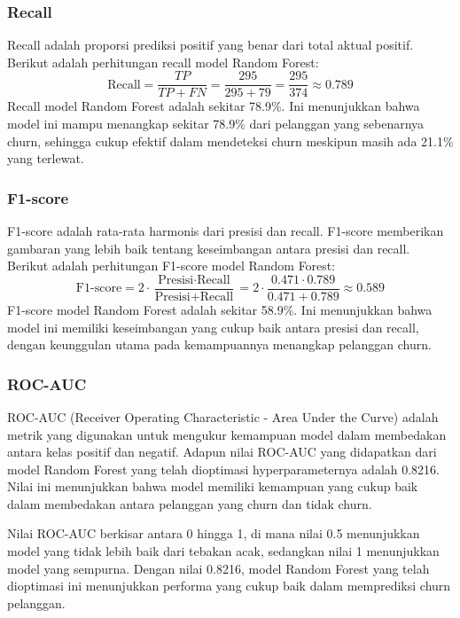 \subsubsection*{Recall}
Recall adalah proporsi prediksi positif yang benar dari total aktual positif. Berikut adalah perhitungan recall model Random Forest:
\begin{equation}
    \text{Recall} = \frac{TP}{TP + FN} = \frac{295}{295 + 79} = \frac{295}{374} \approx 0.789
\end{equation}
Recall model Random Forest adalah sekitar 78.9\%. Ini menunjukkan bahwa model ini mampu menangkap sekitar 78.9\% dari pelanggan yang sebenarnya churn, sehingga cukup efektif dalam mendeteksi churn meskipun masih ada 21.1\% yang terlewat.

\subsubsection*{F1-score}
F1-score adalah rata-rata harmonis dari presisi dan recall. F1-score memberikan gambaran yang lebih baik tentang keseimbangan antara presisi dan recall. Berikut adalah perhitungan F1-score model Random Forest:
\begin{equation}
    \text{F1-score} = 2 \cdot \frac{\text{Presisi} \cdot \text{Recall}}{\text{Presisi} + \text{Recall}} = 2 \cdot \frac{0.471 \cdot 0.789}{0.471 + 0.789} \approx 0.589
\end{equation}
F1-score model Random Forest adalah sekitar 58.9\%. Ini menunjukkan bahwa model ini memiliki keseimbangan yang cukup baik antara presisi dan recall, dengan keunggulan utama pada kemampuannya menangkap pelanggan churn.

\subsubsection*{ROC-AUC}
ROC-AUC (Receiver Operating Characteristic - Area Under the Curve) adalah metrik yang digunakan untuk mengukur kemampuan model dalam membedakan antara kelas positif dan negatif. Adapun nilai ROC-AUC yang didapatkan dari model Random Forest yang telah dioptimasi hyperparameternya adalah 0.8216. Nilai ini menunjukkan bahwa model memiliki kemampuan yang cukup baik dalam membedakan antara pelanggan yang churn dan tidak churn.

Nilai ROC-AUC berkisar antara 0 hingga 1, di mana nilai 0.5 menunjukkan model yang tidak lebih baik dari tebakan acak, sedangkan nilai 1 menunjukkan model yang sempurna. Dengan nilai 0.8216, model Random Forest yang telah dioptimasi ini menunjukkan performa yang cukup baik dalam memprediksi churn pelanggan.

